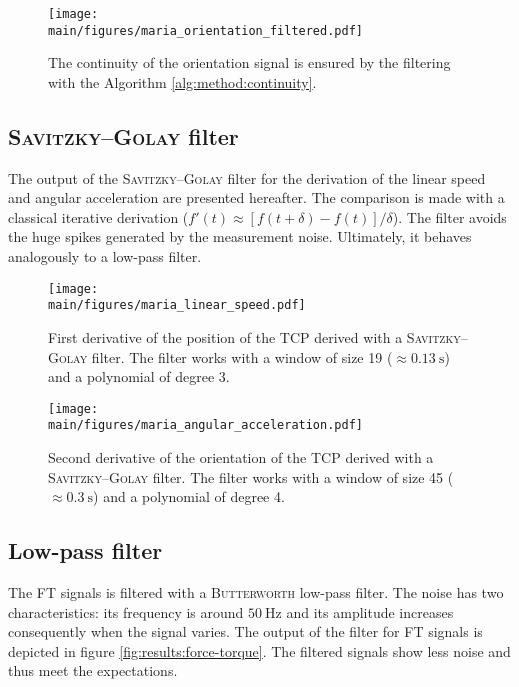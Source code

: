 \documentclass[/home/francois/latex/report/main.tex]{subfiles}
\begin{document}
\begin{figure}[H]
  \centering
  \texttt{[image: \\main/figures/maria\_orientation\_filtered.pdf]}
  \caption{The continuity of the orientation signal is ensured by the filtering with the Algorithm \ref{alg:method:continuity}.}
  \label{fig:results:orientation-filtered}
\end{figure}

\subsection{\textsc{Savitzky–Golay} filter}

The output of the \textsc{Savitzky–Golay} filter for the derivation of the linear speed and angular acceleration are presented hereafter. The comparison is made with a classical iterative derivation ($f'(t) \approx  [f(t+\delta) - f(t)] / \delta$). The filter avoids the huge spikes generated by the measurement noise. Ultimately, it behaves analogously to a low-pass filter.


\begin{figure}[H]
  \centering
  \texttt{[image: \\main/figures/maria\_linear\_speed.pdf]}
  \caption{First derivative of the position of the \ac{TCP} derived with a \textsc{Savitzky–Golay} filter. The filter works with a window of size 19 ($\approx 0.13 \ \si{\second}$) and a polynomial of degree 3.}
  \label{fig:results:linear-speed-filtered}
\end{figure}

\begin{figure}[H]
  \centering
  \texttt{[image: \\main/figures/maria\_angular\_acceleration.pdf]}
  \caption{Second derivative of the orientation of the \ac{TCP} derived with a \textsc{Savitzky–Golay} filter. The filter works with a window of size 45 ($\approx 0.3 \ \si{\second}$) and a polynomial of degree 4.}
  \label{fig:results:angular-acceleration-filtered}
\end{figure}

\subsection{Low-pass filter}

The \ac{FT} signals is filtered with a \textsc{Butterworth} low-pass filter. The noise has two characteristics: its frequency is around $50 \ \si{\hertz}$ and its amplitude increases consequently when the signal varies. The output of the filter for \ac{FT} signals is depicted in figure \ref{fig:results:force-torque}. The filtered signals show less noise and thus meet the expectations.
\end{document}
